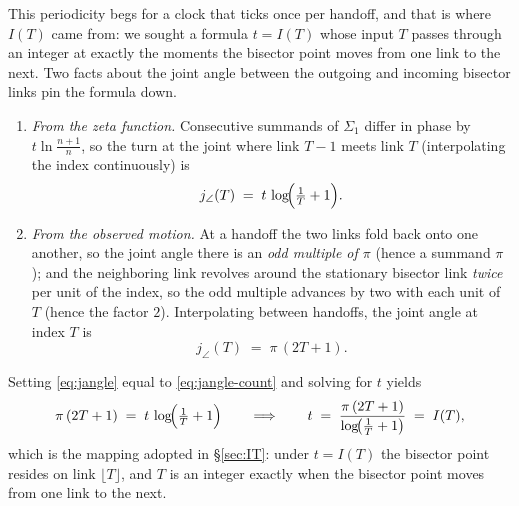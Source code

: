 \documentclass[11pt]{article}
\theoremstyle{definition}
\begin{document}
This periodicity begs for a clock that ticks once per handoff, and that is
where $I(T)$ came from: we sought a formula $t=I(T)$ whose input $T$ passes
through an integer at exactly the moments the bisector point moves from one
link to the next. Two facts about the joint angle between the outgoing and
incoming bisector links pin the formula down.

\begin{enumerate}
\item \emph{From the zeta function.} Consecutive summands of $\Sigma_1$ differ
in phase by $t\ln\frac{n+1}{n}$, so the turn at the joint where link $T-1$
meets link $T$ (interpolating the index continuously) is
\begin{equation}\label{eq:jangle}
j_{\angle}(T) \;=\; t\,\log\!\Bigl(\tfrac{1}{T}+1\Bigr).
\end{equation}
\item \emph{From the observed motion.} At a handoff the two links fold back
onto one another, so the joint angle there is an \emph{odd multiple of $\pi$}
(hence a summand $\pi$); and the neighboring link revolves around the
stationary bisector link \emph{twice} per unit of the index, so the odd
multiple advances by two with each unit of $T$ (hence the factor $2$). Interpolating
between handoffs, the joint angle at index $T$ is
\begin{equation}\label{eq:jangle-count}
j_{\angle}(T) \;=\; \pi\,(2T+1).
\end{equation}
\end{enumerate}

Setting \eqref{eq:jangle} equal to \eqref{eq:jangle-count} and solving for $t$
yields
\begin{equation}\label{eq:IT-derived}
\pi\,(2T+1) \;=\; t\,\log\!\Bigl(\tfrac{1}{T}+1\Bigr)
\qquad\Longrightarrow\qquad
t \;=\; \frac{\pi\,(2T+1)}{\log\!\bigl(\tfrac{1}{T}+1\bigr)} \;=\; I(T),
\end{equation}
which is the mapping adopted in \S\ref{sec:IT}: under $t=I(T)$ the bisector
point resides on link $\lfloor T\rfloor$, and $T$ is an integer exactly when
the bisector point moves from one link to the next.
\end{document}
